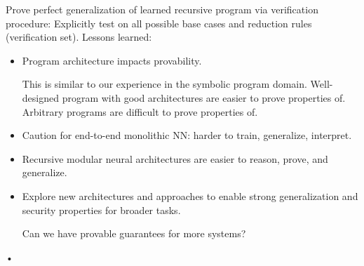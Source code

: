 Prove perfect generalization of learned recursive program via verification procedure: Explicitly test on all possible base cases and reduction rules (verification set).
%
%
%
%
%
%
%
Lessons learned:
\begin{itemize}
\item
Program architecture impacts provability.

This is similar to our experience in the symbolic program domain. Well-designed program with good architectures are easier to prove properties of. Arbitrary programs are difficult to prove properties of.
\item
Caution for end-to-end monolithic NN: harder to train, generalize, interpret.
\item
Recursive modular neural architectures are easier to reason, prove, and generalize. 
\item 
Explore new architectures and approaches to enable strong generalization and security properties for broader tasks.

Can we have provable guarantees for more systems?
\end{itemize}•

